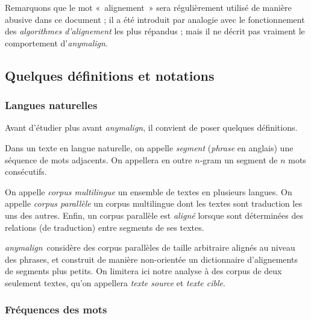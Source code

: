 \documentclass[a4paper,10pt]{article}
\newcommand{\anym}{\emph{anymalign}}
\newcommand{\guill}[1]{«~#1~»}
\begin{document}
Remarquons que le mot \guill{alignement} sera régulièrement utilisé de manière abusive dans ce document ; il a été introduit par analogie avec le fonctionnement des \emph{algorithmes d'alignement} les plus répandus ; mais il ne décrit pas vraiment le comportement d'\anym.

\subsection{Quelques définitions et notations}

\subsubsection{Langues naturelles}

Avant d'étudier plus avant \anym, il convient de poser quelques définitions.

Dans un texte en langue naturelle, on appelle \emph{segment} (\emph{phrase} en anglais) une séquence de mots adjacents. On appellera en outre $n$-gram un segment de $n$ mots consécutifs.

On appelle \emph{corpus multilingue} un ensemble de textes en plusieurs langues. On appelle \emph{corpus parallèle} un corpus multilingue dont les textes sont traduction les uns des autres. Enfin, un corpus parallèle est \emph{aligné} lorsque sont déterminées des relations (de traduction) entre segments de ses textes.

\anym~considère des corpus parallèles de taille arbitraire alignés au niveau des phrases, et construit de manière non-orientée un dictionnaire d'alignements de segments plus petits. On limitera ici notre analyse à des corpus de deux seulement textes, qu'on appellera \emph{texte source} et \emph{texte cible}.




\subsubsection{Fréquences des mots}

\label{zipf}
\end{document}

